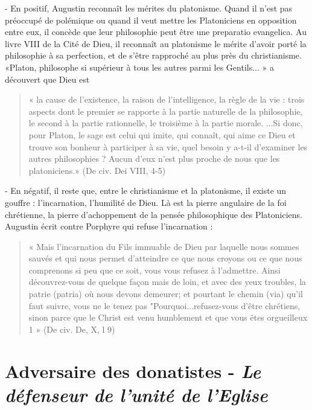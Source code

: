 -	En positif, Augustin reconnaît les mérites du platonisme. Quand il n'est pas préoccupé de polémique ou quand il veut mettre les Platoniciens en opposition entre eux, il concède que leur philosophie peut être une preparatio  evangelica. Au livre VIII de la Cité de Dieu, il reconnaît au platonisme le mérite d'avoir porté la philosophie à sa perfection, et de s'être rapproché au plus près du christianisme.
«Platon, philosophe si supérieur à tous les autres parmi les Gentils... » a découvert
que Dieu est
\begin{quote}
    « la cause de l'existence, la raison de l'intelligence, la règle de la vie : trois aspects dont le premier se rapporte à la partie naturelle de la philosophie, le second à la partie rationnelle, le troisième à la partie morale. ...Si donc, pour Platon, le sage est celui qui imite, qui connaît, qui aime ce Dieu et trouve son bonheur à participer à sa vie, quel besoin y a-t-il d'examiner les autres philosophies ? Aucun d'eux n'est plus proche de nous que les platoniciens.» (De civ. Dei VIII, 4-5)
\end{quote}


- En négatif, il reste que, entre le christianisme et la platonisme, il existe un gouffre : l'incarnation, l'humilité de Dieu. Là est la pierre angulaire de la foi chrétienne, la pierre d'achoppement de la pensée philosophique des Platoniciens. Augustin écrit contre Porphyre qui refuse l'incarnation :
\begin{quote}
    « Mais l'incarnation du Fils immuable de Dieu par laquelle nous sommes sauvés et qui nous permet d'atteindre ce que nous croyons ou ce que nous comprenons si peu que ce soit, vous vous refusez à l'admettre. Ainsi découvrez-vous de quelque façon mais de loin, et avec des yeux troubles, la patrie (patria) où nous devons demeurer;
et  pourtant  le chemin  (via) qu'il  faut  suivre,  vous  ne  le  tenez pas  "Pourquoi...refusez-vous d'être chrétiens, sinon parce que le Christ est venu humblement et que vous êtes orgueilleux 1 » (De civ. De, X, l 9)
\end{quote}


\section{Adversaire des donatistes - \textit{Le défenseur  de l'unité de l'Eglise}}

